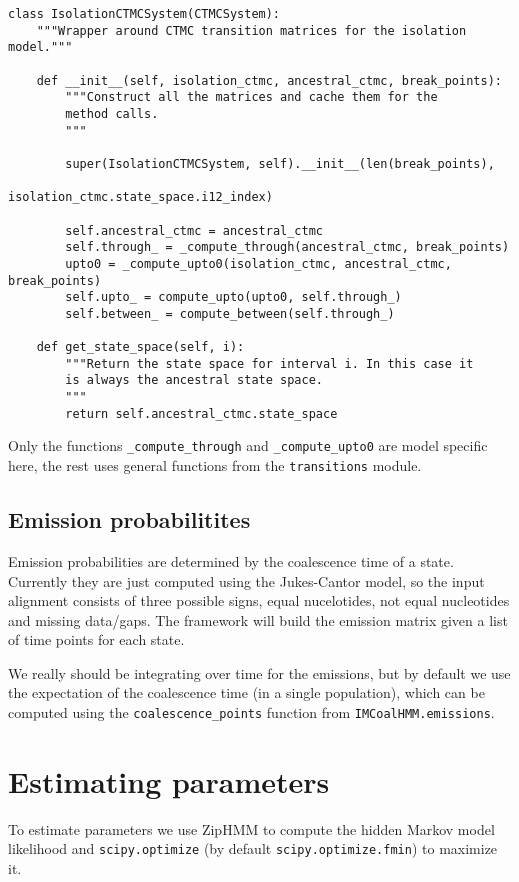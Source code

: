 \documentclass[11pt]{article}
\begin{document}
\begin{verbatim}
class IsolationCTMCSystem(CTMCSystem):
    """Wrapper around CTMC transition matrices for the isolation model."""

    def __init__(self, isolation_ctmc, ancestral_ctmc, break_points):
        """Construct all the matrices and cache them for the
        method calls.
        """

        super(IsolationCTMCSystem, self).__init__(len(break_points),
                                                  isolation_ctmc.state_space.i12_index)

        self.ancestral_ctmc = ancestral_ctmc
        self.through_ = _compute_through(ancestral_ctmc, break_points)
        upto0 = _compute_upto0(isolation_ctmc, ancestral_ctmc, break_points)
        self.upto_ = compute_upto(upto0, self.through_)
        self.between_ = compute_between(self.through_)

    def get_state_space(self, i):
        """Return the state space for interval i. In this case it 
        is always the ancestral state space.
        """
        return self.ancestral_ctmc.state_space
\end{verbatim}

Only the functions \texttt{\_compute\_through} and \texttt{\_compute\_upto0} are model specific here, the rest uses general functions from the \texttt{transitions} module.


\subsection{Emission probabilitites}

Emission probabilities are determined by the coalescence time of a state. Currently they are just computed using the Jukes-Cantor model, so the input alignment consists of three possible signs, equal nucelotides, not equal nucleotides and missing data/gaps. The framework will build the emission matrix given a list of time points for each state.

We really should be integrating over time for the emissions, but by default we use the expectation of the coalescence time (in a single population), which can be computed using the \texttt{coalescence\_points} function from \texttt{IMCoalHMM.emissions}.


\section{Estimating parameters}

To estimate parameters we use ZipHMM \cite{Sand:2013bi} to compute the hidden Markov model likelihood and \texttt{scipy.optimize} (by default \texttt{scipy.optimize.fmin}) to maximize it.




\end{document}

